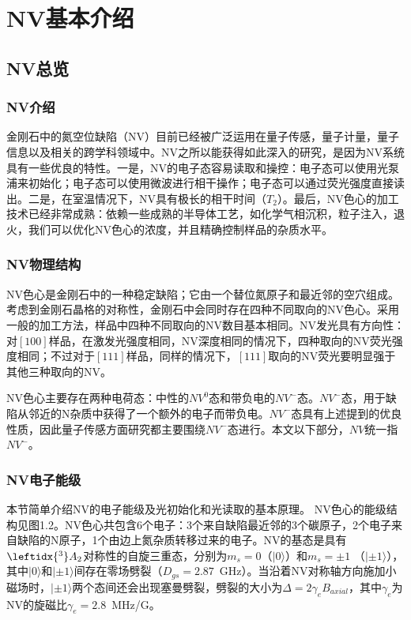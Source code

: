 
\chapter{NV基本介绍}


\section{NV总览}

\subsection{NV介绍}

金刚石中的氮空位缺陷（NV）目前已经被广泛运用在量子传感，量子计量，量子信息以及相关的跨学科领域中。NV之所以能获得如此深入的研究，是因为NV系统具有一些优良的特性。一是，NV的电子态容易读取和操控：电子态可以使用光泵浦来初始化；电子态可以使用微波进行相干操作；电子态可以通过荧光强度直接读出。二是，在室温情况下，NV具有极长的相干时间（$T_2$）。最后，NV色心的加工技术已经非常成熟：依赖一些成熟的半导体工艺，如化学气相沉积，粒子注入，退火，我们可以优化NV色心的浓度，并且精确控制样品的杂质水平。

\subsection{NV物理结构}

NV色心是金刚石中的一种稳定缺陷；它由一个替位氮原子和最近邻的空穴组成。考虑到金刚石晶格的对称性，金刚石中会同时存在四种不同取向的NV色心。采用一般的加工方法，样品中四种不同取向的NV数目基本相同。NV发光具有方向性：对$[100]$样品，在激发光强度相同，NV深度相同的情况下，四种取向的NV荧光强度相同；不过对于$[111]$样品，同样的情况下，$[111]$取向的NV荧光要明显强于其他三种取向的NV。

NV色心主要存在两种电荷态：中性的$NV^0$态和带负电的$NV^-$态。$NV^-$态，用于缺陷从邻近的N杂质中获得了一个额外的电子而带负电。$NV^-$态具有上述提到的优良性质，因此量子传感方面研究都主要围绕$NV^-$态进行。本文以下部分，$NV$统一指$NV^-$。

\subsection{NV电子能级}

本节简单介绍NV的电子能级及光初始化和光读取的基本原理。
NV色心的能级结构见图1.2。NV色心共包含6个电子：3个来自缺陷最近邻的3个碳原子，2个电子来自缺陷的N原子，1个由边上氮杂质转移过来的电子。NV的基态是具有$\leftidx{^3}A_2$对称性的自旋三重态，分别为$m_s=0$（$|0\rangle$）和$m_s=\pm{1}$  （$|\pm{1}\rangle$），其中$|0\rangle$和$|\pm{1}\rangle$间存在零场劈裂（$D_{gs}=2.87$\ GHz）。当沿着NV对称轴方向施加小磁场时，$|\pm{1}\rangle$两个态间还会出现塞曼劈裂，劈裂的大小为$\Delta=2\gamma_{e} B_{axial}$，其中$\gamma_{e}$为NV的旋磁比$\gamma_{e}=2.8$\ MHz/G。


